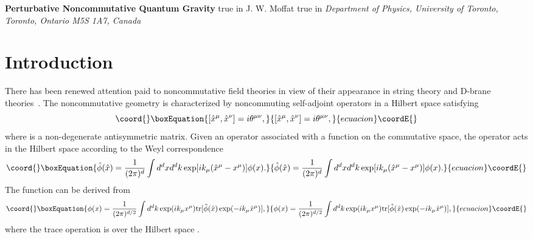 \documentclass[a4paper,10pt]{article}
\begin{document}
\pagestyle{plain}
\setcounter{page}{1}
\begin{center}
{\large\bf Perturbative Noncommutative Quantum Gravity}
 true in
{\large J. W. Moffat}
 true in
{\it Department of Physics, University of Toronto,
Toronto, Ontario M5S 1A7, Canada}
\end{center}
\begin{abstract}%
We study perturbative noncommutative quantum gravity by expanding the
gravitational field about a fixed classical background. A calculation of
the one loop gravitational self-energy graph reveals that only the
non-planar graviton loops are damped by oscillating internal momentum
dependent factors. The noncommutative quantum gravity perturbation theory
is not renormalizable beyond one loop for matter-free gravity and all loops
for matter interactions. Comments are made about the nonlocal gravitational
interactions produced by the noncommutative spacetime geometry.
\end{abstract}



\section{Introduction}

There has been renewed attention paid to noncommutative field theories in
view of their appearance in string theory and D-brane
theories~\cite{Connes,Witten,Douglas}. The noncommutative
geometry is characterized by \coordHE{} noncommuting self-adjoint
operators \coordHE{} in a Hilbert space \coordHE{} satisfying
\begin{equation}\coord{}\boxEquation{
[{\hat x}^\mu,{\hat x}^\nu]=i\theta^{\mu\nu},
}{
[{\hat x}^\mu,{\hat x}^\nu]=i\theta^{\mu\nu},
}{ecuacion}\coordE{}\end{equation}
where \myHighlight{$\theta^{\mu\nu}$}\coordHE{} is a non-degenerate \coordHE{} antisymmetric
matrix. Given an operator \myHighlight{${\hat\phi}$}\coordHE{} associated with a
function \coordHE{} on the commutative space, the operator \myHighlight{${\hat\phi}$}\coordHE{} acts
in the Hilbert space \coordHE{} according to the Weyl correspondence
\begin{equation}\coord{}\boxEquation{
{\hat\phi}({\hat x})=\frac{1}{(2\pi)^d}\int d^dxd^dk
\exp[ik_\mu({\hat x}^\mu-x^\mu)]\phi(x).
}{
{\hat\phi}({\hat x})=\frac{1}{(2\pi)^d}\int d^dxd^dk
\exp[ik_\mu({\hat x}^\mu-x^\mu)]\phi(x).
}{ecuacion}\coordE{}\end{equation}
The function \coordHE{} can be derived from
\begin{equation}\coord{}\boxEquation{
\phi(x)=\frac{1}{(2\pi)^{d/2}}\int d^dk\exp(ik_\mu x^\mu)
{\rm tr}[{\hat\phi}({\hat x})\exp(-ik_\mu{\hat x}^\mu)],
}{
\phi(x)=\frac{1}{(2\pi)^{d/2}}\int d^dk\exp(ik_\mu x^\mu)
{\rm tr}[{\hat\phi}({\hat x})\exp(-ik_\mu{\hat x}^\mu)],
}{ecuacion}\coordE{}\end{equation}
where the trace operation \coordHE{} is over the Hilbert space \coordHE{}.
\end{document}
